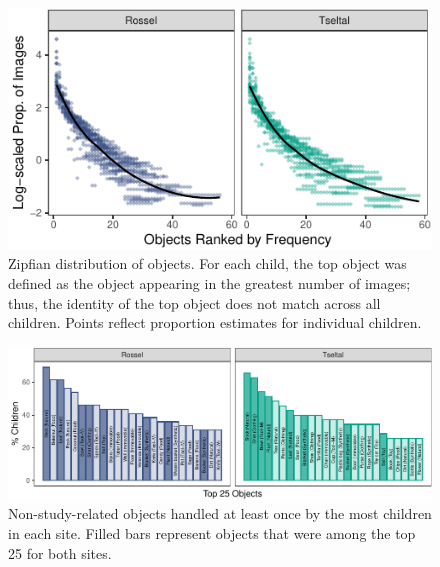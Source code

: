 \documentclass[10pt, letterpaper]{article}
\newenvironment{CodeChunk}{}{}
\begin{document}
\begin{CodeChunk}
\begin{figure}[h]

{\centering \includegraphics{figs/zipfian-objects-fig-1} 

}

\caption[Zipfian distribution of objects]{Zipfian distribution of objects. For each child, the top object was defined as the object appearing in the greatest number of images; thus, the identity of the top object does not match across all children. Points reflect proportion estimates for individual children.}\label{fig:zipfian-objects-fig}
\end{figure}
\end{CodeChunk}

\begin{CodeChunk}
\begin{figure}[!ht]

{\centering \includegraphics{figs/top-objects-fig-1} 

}

\caption[Non-study-related objects handled at least once by the most children in each site]{Non-study-related objects handled at least once by the most children in each site. Filled bars represent objects that were among the top 25 for both sites.}\label{fig:top-objects-fig}
\end{figure}
\end{CodeChunk}
\end{document}
